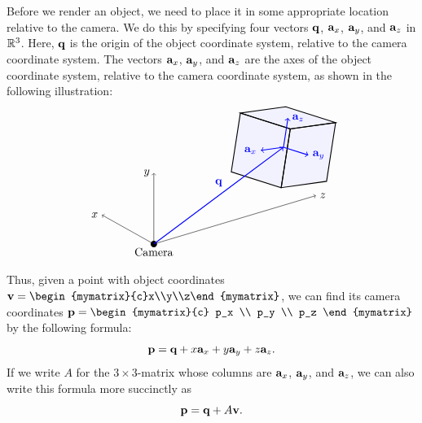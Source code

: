 Before we render an object, we need to place it in some appropriate
location relative to the camera. We do this by specifying four vectors
$\mbox{\bf q}$, $\mbox{\bf a}_x$, $\mbox{\bf a}_y$, and $\mbox{\bf a}_z$ in
$\mathbb{R}^3$. Here, $\mbox{\bf q}$ is the origin of the object coordinate
system, relative to the camera coordinate system. The vectors
$\mbox{\bf a}_x$, $\mbox{\bf a}_y$, and $\mbox{\bf a}_z$ are the axes of the
object coordinate system, relative to the camera coordinate system, as
shown in the following illustration:
\begin{equation*}
  \begin{tikzpicture}
    \fill (0,0) circle (0.1) node[below] {Camera};
    \begin{scope}[x={(-0.8cm,0.45cm)},z={(1cm,0.3cm)},y={(0cm,1.1cm)}]
      \draw[->] (0,0,0) -- (2,0,0) node[left]{$x$};
      \draw[->] (0,0,0) -- (0,2,0) node[left]{$y$};
      \draw[->] (0,0,0) -- (0,0,5) node[right]{$z$};
    \end{scope}
    \begin{scope}[shift={(4,3)}]
      \begin{scope}[x={(-1cm,-0.14cm)},y={(1.1cm,-0.35cm)},z={(0.2cm,1.3cm)},scale=0.7]
        \begin{scope}
          \clip (1,-1,1) -- (1,-1,-1) -- (1,1,-1) -- (-1,1,-1)
          -- (-1,1,1) -- (-1,-1,1) -- cycle;
          \fill[blue!5] (1,-1,1) -- (1,-1,-1) -- (1,1,-1) -- (-1,1,-1)
          -- (-1,1,1) -- (-1,-1,1) -- cycle;
        \end{scope}
        \draw[thick] ( 1, 1, 1) -- ( 1, 1,-1) -- ( 1,-1,-1) -- ( 1,-1, 1) -- cycle;
        \draw[thick] ( 1, 1, 1) -- (-1, 1, 1) -- (-1, 1,-1) -- ( 1, 1,-1) -- cycle;
        \draw[thick] ( 1, 1, 1) -- ( 1,-1, 1) -- (-1,-1, 1) -- (-1, 1, 1) -- cycle;
        \draw[thick,blue,->] (0,0,0) -- (1,0,0) node[left]{$\vect{a}_x$};
        \draw[thick,blue,->] (0,0,0) -- (0,1,0) node[right]{$\vect{a}_y$};
        \draw[thick,blue,->] (0,0,0) -- (0,0,1) node[right]{$\vect{a}_z$};
      \end{scope}
    \end{scope}
    \draw[thick,blue,->] (0,0) -- node[above=1ex]{$\vect{q}$}(4,3);
  \end{tikzpicture}
\end{equation*}
Thus, given a point with object coordinates
$\vect{v}=\begin{mymatrix}{c}x\\y\\z\end{mymatrix}$, we can find its
camera coordinates
$\vect{p} = \begin{mymatrix}{c} p_x \\ p_y \\ p_z \end{mymatrix}$ by
the following formula:
\begin{equation*}
  \mbox{\bf p} = \mbox{\bf q} + x\mbox{\bf a}_x + y\mbox{\bf a}_y + z\mbox{\bf a}_z.
\end{equation*}
If we write $A$ for the $3\times 3$-matrix whose columns are $\mbox{\bf a}_x$,
$\mbox{\bf a}_y$, and $\mbox{\bf a}_z$, we can also write this formula more succinctly as
\begin{equation*}
  \mbox{\bf p} = \mbox{\bf q} + A\mbox{\bf v}.
\end{equation*}

